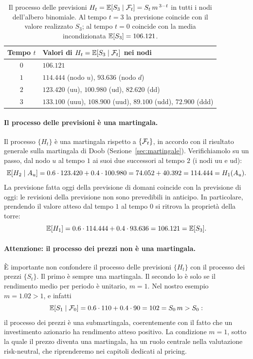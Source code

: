 \begin{example}
\begin{table}[ht]
\centering
\begin{tabular}{|c|l|}
\hline
\textbf{Tempo} $t$ & \textbf{Valori di } $H_t=\mathbb{E}[S_3\mid\mathcal{F}_t]$
\textbf{ nei nodi}\\
\hline
$0$ & $106.121$\\
$1$ & $114.444$ (nodo $u$), \quad $93.636$ (nodo $d$)\\
$2$ & $123.420$ (uu), \quad $100.980$ (ud), \quad $82.620$ (dd)\\
$3$ & $133.100$ (uuu), \quad $108.900$ (uud), \quad
       $89.100$ (udd), \quad $72.900$ (ddd)\\
\hline
\end{tabular}
\caption{Il processo delle previsioni $H_t=\mathbb{E}[S_3\mid\mathcal{F}_t]=S_t\,
m^{\,3-t}$ in tutti i nodi dell'albero binomiale. Al tempo $t=3$ la
previsione coincide con il valore realizzato $S_3$; al tempo $t=0$
coincide con la media incondizionata $\mathbb{E}[S_3]=106.121$.}
\label{tab:previsioni-binomiale}
\end{table}

\paragraph{Il processo delle previsioni \`{e} una martingala.}
Il processo $\{H_t\}$ \`{e} una martingala rispetto a $\{\mathcal{F}_t\}$, in
accordo con il risultato generale sulla martingala di Doob
(Sezione~\ref{sec:martingale}). Verifichiamolo su un passo, dal nodo
$u$ al tempo $1$ ai suoi due successori al tempo $2$ (i nodi uu e ud):
\[
\mathbb{E}[H_2\mid A_u]=0.6\cdot 123.420+0.4\cdot 100.980
=74.052+40.392=114.444=H_1(A_u).
\]
La previsione fatta oggi della previsione di domani coincide con la
previsione di oggi: le revisioni della previsione non sono prevedibili
in anticipo. In particolare, prendendo il valore atteso dal tempo $1$
al tempo $0$ si ritrova la propriet\`{a} della torre:
\[
\mathbb{E}[H_1]=0.6\cdot 114.444+0.4\cdot 93.636=106.121=\mathbb{E}[S_3].
\]

\paragraph{Attenzione: il processo dei prezzi non \`{e} una
martingala.} \`{E} importante non confondere il processo delle
previsioni $\{H_t\}$ con il processo dei prezzi $\{S_t\}$. Il primo
\`{e} sempre una martingala. Il secondo lo \`{e} solo se il rendimento
medio per periodo \`{e} unitario, $m=1$. Nel nostro esempio $m=1.02>1$,
e infatti
\[
\mathbb{E}[S_1\mid\mathcal{F}_0]=0.6\cdot 110+0.4\cdot 90=102=S_0\,m>S_0:
\]
il processo dei prezzi \`{e} una submartingala, coerentemente con il
fatto che un investimento azionario ha rendimento atteso positivo. La
condizione $m=1$, sotto la quale il prezzo diventa una martingala, ha
un ruolo centrale nella valutazione risk-neutral, che riprenderemo nei
capitoli dedicati al pricing.
\end{example}

